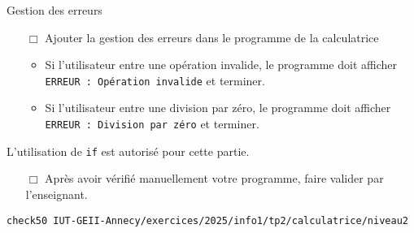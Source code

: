 \begin{UPSTIManipulation}{Gestion des erreurs}
	\begin{itemize}
		\item[$\Box$] Ajouter la gestion des erreurs dans le programme de la calculatrice
		      \begin{itemize}
			      \item Si l'utilisateur entre une opération invalide, le programme doit afficher \texttt{ERREUR : Opération invalide} et terminer.
			      \item Si l'utilisateur entre une division par zéro, le programme doit afficher \texttt{ERREUR : Division par zéro} et terminer.
		      \end{itemize}
	\end{itemize}
	L'utilisation de \texttt{if} est autorisé pour cette partie.
	\begin{itemize}
		\item[$\Box$] Après avoir vérifié manuellement votre programme, faire valider par l'enseignant.
	\end{itemize}

	\tcblower 
\begin{lstlisting}
check50 IUT-GEII-Annecy/exercices/2025/info1/tp2/calculatrice/niveau2
\end{lstlisting}
\end{UPSTIManipulation}








